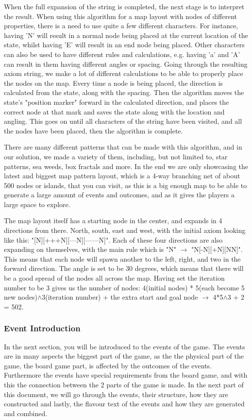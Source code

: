 When the full expansion of the string is completed, the next stage is to interpret the result. When using this algorithm for a map layout with nodes of different properties, there is a need to use quite a few different characters. For instance, having 'N' will result in a normal node being placed at the current location of the state, whilst having 'E' will result in an end node being placed. Other characters can also be used to have different rules and calculations, e.g. having 'a' and 'A' can result in them having different angles or spacing.
Going through the resulting axiom string, we make a lot of different calculations to be able to properly place the nodes on the map. Every time a node is being placed, the direction is calculated from the state, along with the spacing. Then the algorithm moves the state's "position marker" forward in the calculated direction, and places the correct node at that mark and saves the state along with the location and angling.
This goes on until all characters of the string have been visited, and all the nodes have been placed, then the algorithm is complete.

There are many different patterns that can be made with this algorithm, and in our solution, we made a variety of them, including, but not limited to, star patterns, sea weeds, box fractals and more. 
In the end we are only showcasing the latest and biggest map pattern layout, which is a 4-way branching net of about 500 nodes or islands, that you can visit, as this is a big enough map to be able to generate a large amount of events and outcomes, and as it gives the players a large space to explore.

The map layout itself has a starting node in the center, and expands in 4 directions from there. North, south, east and west, with the initial axiom looking like this: "[N][+++N][---N][------N]". Each of these four directions are also expanding on themselves, with the main rule which is "N" $\rightarrow$ "N[-N][+N][NN]". This means that each node will spawn another to the left, right, and two in the forward direction. The angle is set to be 30 degrees, which means that there will be a good spread of the nodes all across the map. Having set the iteration number to be 3 gives us the number of nodes: 4(initial nodes) * 5(each become 5 new nodes)$\wedge$3(iteration number) + the extra start and goal node $\rightarrow$ 4*5$\wedge$3 + 2 = 502.

\subsubsection{Event Introduction}
In the next section, you will be introduced to the events of the game. The events are in many aspects the biggest part of the game, as the the physical part of the game, the board game part, is affected by the outcomes of the events. Furthermore the events have special requirements from the board game, and with this the connection between the 2 parts of the game is made.
In the next part of this document, we will go through the events, their structure, how they are constructed and lastly, the flavour text of the events and how they are generated and combined.

